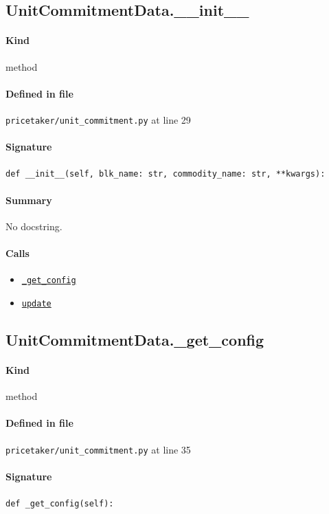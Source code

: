 \documentclass[11pt]{report}
\begin{document}
\subsection{UnitCommitmentData.\_\_init\_\_}
\label{def:pricetaker-unit_commitment.py:UnitCommitmentData.__init__:L29}
\paragraph{Kind} method
\paragraph{Defined in file} \texttt{pricetaker/unit\_commitment.py} at line 29
\paragraph{Signature} \texttt{def \_\_init\_\_(self, blk\_name: str, commodity\_name: str, **kwargs):}
\paragraph{Summary} No docstring.
\paragraph{Calls}
\begin{itemize}[leftmargin=*]
  \item \hyperref[def:pricetaker-unit_commitment.py:UnitCommitmentData._get_config:L35]{\texttt{\_get\_config}}
  \item \hyperref[def:pricetaker-unit_commitment.py:UnitCommitmentData.update:L84]{\texttt{update}}
\end{itemize}
\subsection{UnitCommitmentData.\_get\_config}
\label{def:pricetaker-unit_commitment.py:UnitCommitmentData._get_config:L35}
\paragraph{Kind} method
\paragraph{Defined in file} \texttt{pricetaker/unit\_commitment.py} at line 35
\paragraph{Signature} \texttt{def \_get\_config(self):}
\end{document}
